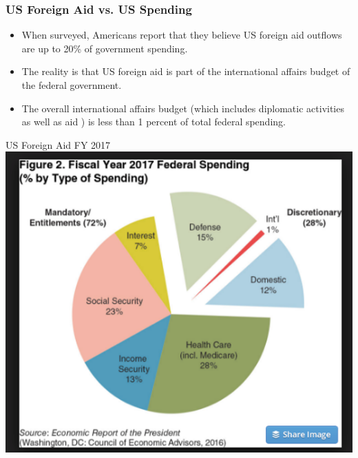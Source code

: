 \documentclass[handout]{beamer}
\begin{document}
\begin{frame} 
	\frametitle{\LARGE{US Foreign Aid vs. US Spending}}
	\begin{itemize}
		\item When surveyed, Americans report that they believe US foreign aid outflows are up to 20\% of government spending. \pause
		\item The reality is that US foreign aid is part of the international affairs budget of the federal government. \pause
		\item The overall international affairs budget (which includes diplomatic activities as well as aid ) is less than 1 percent of total federal spending.
	\end{itemize}
\end{frame}

\begin{frame}{\LARGE US Foreign Aid FY 2017}
	\centering
	\includegraphics[width=\textwidth,height=\textheight,keepaspectratio]{USfedbudget.png}
\end{frame}
\end{document}
